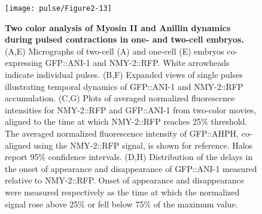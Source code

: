 \begin{figure}[!htbp]
\centering
\texttt{[image: pulse/Figure2-13]}

\caption{ \label{fig:2213} \textbf{Two color analysis of Myosin II and Anillin dynamics during pulsed contractions in one- and two-cell embryos.}(A,E) Micrographs of two-cell (A) and one-cell (E) embryos co-expressing GFP::ANI-1 and NMY-2::RFP. White arrowheads indicate individual pulses. (B,F) Expanded views of single pulses illustrating temporal dynamics of GFP::ANI-1 and NMY-2::RFP accumulation. (C,G) Plots of averaged normalized fluorescence intensities for NMY-2::RFP and GFP::ANI-1 from two-color movies, aligned to the time at which NMY-2::RFP reaches 25$\%$ threshold. The averaged normalized fluorescence intensity of GFP::AHPH, co-aligned using the NMY-2::RFP signal, is shown for reference. Halos report 95$\%$ confidence intervals. (D,H) Distribution of the delays in the onset of appearance and disappearance of GFP::ANI-1 measured relative to NMY-2::RFP.  Onset of appearance and disappearance were measured respectively as the time at which the normalized signal rose above 25$\%$ or fell below 75$\%$ of the maximum value. }
\end{figure}





